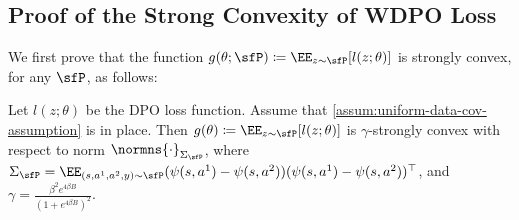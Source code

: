 \subsection{Proof of the Strong Convexity of WDPO Loss}\label{sec:proof-of-sup-dpo-strongly-convex}
We first prove that the function $g(\theta;\sfP)\coloneqq \EE_{z\sim\sfP}[l(z;\theta)]$ is strongly convex, for any $\sfP$, as follows:
\begin{lemma}\label{lem:expected-dpo-strongly-convex}
    Let $l(z;\theta)$ be the DPO loss function. Assume that \cref{assum:uniform-data-cov-assumption} is in place. Then $g(\theta)\coloneqq \EE_{z\sim \sfP }[l(z;\theta)]$ is $\gamma$-strongly convex with respect to norm $\normns{\cdot}_{\Sigma_{\sfP}}$, where $\Sigma_{\sfP}=\EE_{(s,a^1,a^2,y)\sim\sfP}(\psi(s,a^1) - \psi(s,a^2))(\psi(s,a^1) - \psi(s,a^2))^{\top}$, and $\gamma=\frac{\beta^2e^{4\beta B}}{(1+e^{4\beta B})^2}$.
\end{lemma}
